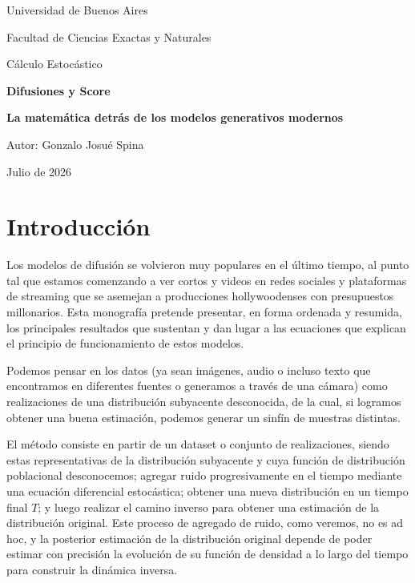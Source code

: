 \documentclass[12pt, a4paper]{report}
\theoremstyle{plain}
\theoremstyle{definition}
\theoremstyle{remark}
\begin{document}
\begin{titlepage}
  \centering
  \vspace*{2cm}
  {\Large Universidad de Buenos Aires \par}
  \vspace{0.5cm}
  {\large Facultad de Ciencias Exactas y Naturales \par}
  {\large Cálculo Estocástico \par}
  \vspace{3cm}
  {\Huge\bfseries Difusiones y Score \par}
  \vspace{0.3cm}
  {\Large\bfseries La matemática detrás de los modelos generativos modernos \par}  
  \vspace{2cm}
  {\large Autor: Gonzalo Josué Spina \par}
  \vspace{0.5cm}  
  \vfill
  {\large Julio de 2026 \par}
\end{titlepage}

\clearpage

\tableofcontents

\clearpage


\chapter{Introducción}
\label{chap:introduccion}

Los modelos de difusión se volvieron muy populares en el último tiempo, al punto tal que estamos comenzando a ver cortos y videos en redes sociales y plataformas de streaming que se asemejan a producciones hollywoodenses con presupuestos millonarios. Esta monografía pretende presentar, en forma ordenada y resumida, los principales resultados que sustentan y dan lugar a las ecuaciones que explican el principio de funcionamiento de estos modelos.

Podemos pensar en los datos (ya sean imágenes, audio o incluso texto que encontramos en diferentes fuentes o generamos a través de una cámara) como realizaciones de una distribución subyacente desconocida, de la cual, si logramos obtener una buena estimación, podemos generar un sinfín de muestras distintas.

El método consiste en partir de un dataset o conjunto de realizaciones, siendo estas representativas de la distribución subyacente y cuya función de distribución poblacional desconocemos; agregar ruido progresivamente en el tiempo mediante una ecuación diferencial estocástica; obtener una nueva distribución en un tiempo final $T$; y luego realizar el camino inverso para obtener una estimación de la distribución original. Este proceso de agregado de ruido, como veremos, no es ad hoc, y la posterior estimación de la distribución original depende de poder estimar con precisión la evolución de su función de densidad a lo largo del tiempo para construir la dinámica inversa.
\end{document}
